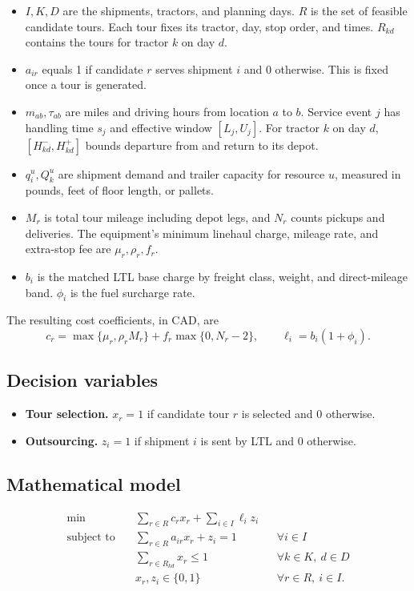 \documentclass[11pt,letterpaper]{article}
\begin{document}
\begin{itemize}
\setlength{\itemsep}{2pt}
\item \(I,K,D\) are the shipments, tractors, and planning days.
\(R\) is the set of feasible candidate tours. Each tour fixes its
tractor, day, stop order, and times. \(R_{kd}\) contains the tours for
tractor \(k\) on day \(d\).
\item \(a_{ir}\) equals 1 if candidate \(r\) serves shipment \(i\)
and 0 otherwise. This is fixed once a tour is generated.
\item \(m_{ab},\tau_{ab}\) are miles and driving hours from location \(a\)
to \(b\). Service event \(j\) has handling time \(s_j\) and effective
window \([L_j,U_j]\). For tractor \(k\) on day \(d\),
\([H^-_{kd},H^+_{kd}]\) bounds departure from and return to its depot.
\item \(q_i^u,Q_k^u\) are shipment demand and trailer capacity for
resource \(u\), measured in pounds, feet of floor length, or pallets.
\item \(M_r\) is total tour mileage including depot legs, and \(N_r\)
counts pickups and deliveries. The equipment's minimum linehaul charge,
mileage rate, and extra-stop fee are \(\mu_r,\rho_r,f_r\).
\item \(b_i\) is the matched LTL base charge by freight class, weight,
and direct-mileage band. \(\phi_i\) is the fuel surcharge rate.
\end{itemize}

The resulting cost coefficients, in CAD, are
\[
c_r=\max\{\mu_r,\rho_r M_r\}+f_r\max\{0,N_r-2\},
\qquad \ell_i=b_i(1+\phi_i).
\]

\subsection*{Decision variables}

\begin{itemize}
\setlength{\itemsep}{2pt}
\item \textbf{Tour selection.} \(x_r=1\) if candidate tour \(r\)
is selected and 0 otherwise.
\item \textbf{Outsourcing.} \(z_i=1\) if shipment \(i\) is sent by LTL
and 0 otherwise.
\end{itemize}

\newpage
\subsection*{Mathematical model}

\begin{align}
\min\quad & \sum_{r\in R} c_r x_r+\sum_{i\in I}\ell_i z_i
   \tag{0}\label{eq:objective}\\
\text{subject to}\quad
& \sum_{r\in R}a_{ir}x_r+z_i=1 && \forall i\in I
   \tag{1}\label{eq:coverage}\\
& \sum_{r\in R_{kd}}x_r\le 1 && \forall k\in K,\ d\in D
   \tag{2}\label{eq:tractor}\\
& x_r,z_i\in\{0,1\} && \forall r\in R,\ i\in I.
   \tag{3}\label{eq:binary}
\end{align}
\end{document}
